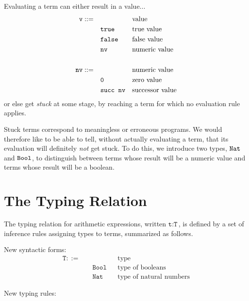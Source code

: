 \documentclass[11pt,twoside=off,numbers=noenddot]{scrbook}
\begin{document}
Evaluating a term can either result in a value...
\begin{align*}
  \ttt{v} ::= & \quad && \text{value} \\
  & \quad \ttt{true} && \text{true value} \\
  & \quad \ttt{false} && \text{false value} \\
  & \quad \ttt{nv} && \text{numeric value} \\
  \\
  \ttt{nv} ::= & \quad && \text{numeric value} \\
  & \quad \ttt{0} && \text{zero value} \\
  & \quad \ttt{succ nv} && \text{successor value}
\end{align*}
or else get \textit{stuck} at some stage, by reaching a term for
which no evaluation rule applies.

Stuck terms correspond to meaningless or erroneous programs. We would
therefore like to be able to tell, without actually evaluating a
term, that its evaluation will definitely \textit{not} get stuck. To
do this, we introduce two types, $\ttt{Nat}$ and $\ttt{Bool}$, to
distinguish between terms whose result will be a numeric value and
terms whose result will be a boolean.

\section{The Typing Relation}
The typing relation for arithmetic expressions, written $\texttt{t} :
\texttt{T}$, is defined by a set of inference rules assigning types
to terms, summarized as follows.

New syntactic forms:
\begin{align*}
  \texttt{T} ::= & \quad && \text{type} \\
  & \quad \texttt{Bool} && \text{type of booleans} \\
  & \quad \texttt{Nat} && \text{type of natural numbers}
\end{align*}

New typing rules:
\begin{prooftree}
\end{prooftree}

\begin{prooftree}
\end{prooftree}

\begin{prooftree}
\end{prooftree}
\end{document}
